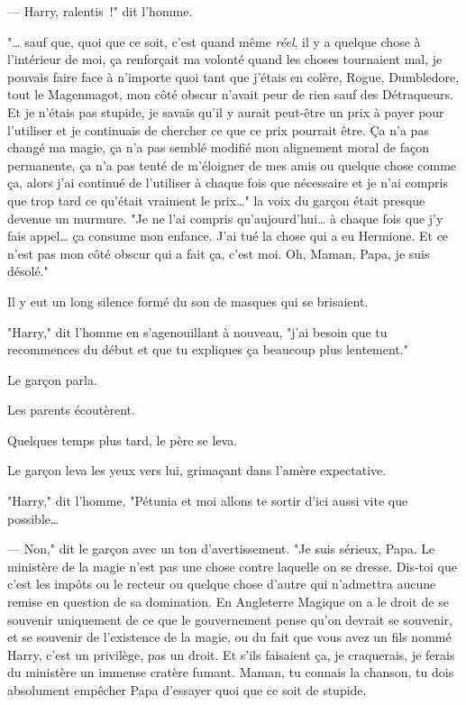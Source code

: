 --- Harry, ralentis~!" dit l'homme.

"… sauf que, quoi que ce soit, c'est quand même \emph{réel}, il y a quelque chose à l'intérieur de moi, ça renforçait ma volonté quand les choses tournaient mal, je pouvais faire face à n'importe quoi tant que j'étais en colère, Rogue, Dumbledore, tout le Magenmagot, mon côté obscur n'avait peur de rien sauf des Détraqueurs. Et je n'étais pas stupide, je savais qu'il y aurait peut-être un prix à payer pour l'utiliser et je continuais de chercher ce que ce prix pourrait être. Ça n'a pas changé ma magie, ça n'a pas semblé modifié mon alignement moral de façon permanente, ça n'a pas tenté de m'éloigner de mes amis ou quelque chose comme ça, alors j'ai continué de l'utiliser à chaque fois que nécessaire et je n'ai compris que trop tard ce qu'était vraiment le prix…" la voix du garçon était presque devenue un murmure. "Je ne l'ai compris qu'aujourd'hui… à chaque fois que j'y fais appel… ça consume mon enfance. J'ai tué la chose qui a eu Hermione. Et ce n'est pas mon côté obscur qui a fait ça, c'est moi. Oh, Maman, Papa, je suis désolé."

Il y eut un long silence formé du son de masques qui se brisaient.

"Harry," dit l'homme en s'agenouillant à nouveau, "j'ai besoin que tu recommences du début et que tu expliques ça beaucoup plus lentement."

Le garçon parla.

Les parents écoutèrent.

Quelques temps plus tard, le père se leva.

Le garçon leva les yeux vers lui, grimaçant dans l'amère expectative.

"Harry," dit l'homme, "Pétunia et moi allons te sortir d'ici aussi vite que possible…

--- Non," dit le garçon avec un ton d'avertissement. "Je suis sérieux, Papa. Le ministère de la magie n'est pas une chose contre laquelle on se dresse. Dis-toi que c'est les impôts ou le recteur ou quelque chose d'autre qui n'admettra aucune remise en question de sa domination. En Angleterre Magique on a le droit de se souvenir uniquement de ce que le gouvernement pense qu'on devrait se souvenir, et se souvenir de l'existence de la magie, ou du fait que vous avez un fils nommé Harry, c'est un privilège, pas un droit. Et s'ils faisaient ça, je craquerais, je ferais du ministère un immense cratère fumant. Maman, tu connais la chanson, tu dois absolument empêcher Papa d'essayer quoi que ce soit de stupide.

